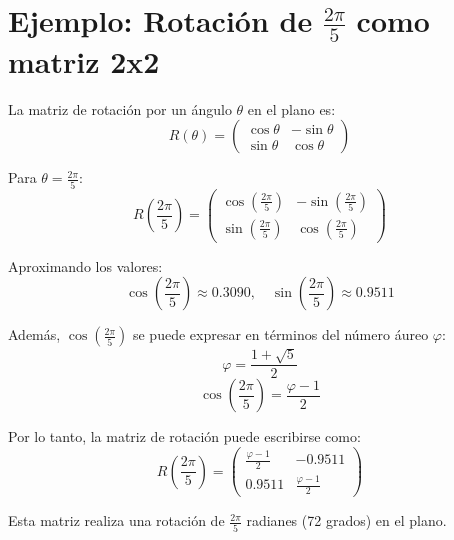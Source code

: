 \section{Ejemplo: Rotación de $\frac{2\pi}{5}$ como matriz 2x2}\label{sec:ejemplo}
La matriz de rotación por un ángulo $\theta$ en el plano es:
\begin{equation*}
R(\theta) = \begin{pmatrix}
\cos \theta & -\sin \theta \\
\sin \theta & \cos \theta
\end{pmatrix}
\end{equation*}

Para $\theta = \frac{2\pi}{5}$:
\begin{equation*}
R\left(\frac{2\pi}{5}\right) = \begin{pmatrix}
\cos\left(\frac{2\pi}{5}\right) & -\sin\left(\frac{2\pi}{5}\right) \\
\sin\left(\frac{2\pi}{5}\right) & \cos\left(\frac{2\pi}{5}\right)
\end{pmatrix}
\end{equation*}

Aproximando los valores:
\begin{equation*}
\cos\left(\frac{2\pi}{5}\right) \approx 0.3090, \quad \sin\left(\frac{2\pi}{5}\right) \approx 0.9511
\end{equation*}

Además, $\cos\left(\frac{2\pi}{5}\right)$ se puede expresar en términos del número áureo $\varphi$:
\begin{equation*}
\varphi = \frac{1 + \sqrt{5}}{2}
\end{equation*}
\begin{equation*}
\cos\left(\frac{2\pi}{5}\right) = \frac{\varphi - 1}{2}
\end{equation*}

Por lo tanto, la matriz de rotación puede escribirse como:
\begin{equation*}
R\left(\frac{2\pi}{5}\right) = \begin{pmatrix}
\frac{\varphi - 1}{2} & -0.9511 \\
0.9511 & \frac{\varphi - 1}{2}
\end{pmatrix}
\end{equation*}

Esta matriz realiza una rotación de $\frac{2\pi}{5}$ radianes (72 grados) en el plano.
